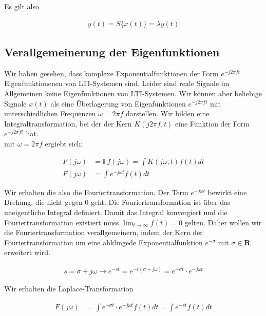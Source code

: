 \documentclass[10pt,a4paper]{article}
\begin{document}
  Es gilt also 
  \begin{mdframed}[style=exercise]
    \begin{align*}
        y(t) = S\{x(t)\} = \lambda y(t) 
    \end{align*}
  \end{mdframed}
  

  \subsection{Verallgemeinerung der Eigenfunktionen}
  Wir haben gesehen, dass komplexe Exponentialfunktionen der Form $e^{-j2\pi ft}$ Eigenfunktionenen von LTI-Systemen sind.
  Leider sind reale Signale im Allgemeinen keine Eigenfunktionen von LTI-Systemen.
  Wir können aber beliebige Signale $x(t)$ als eine Überlagerung von Eigenfunktionen $e^{-j2\pi ft}$ mit unterschiedlichen
  Frequenzen $\omega = 2\pi f$ darstellen.
  Wir bilden eine Integraltransformation, bei der der Kern $K(j2\pi f,t)$ eine Funktion der Form $e^{-j2\pi ft}$ hat.\\
  mit $\omega = 2\pi f$ ergiebt sich:
  \begin{mdframed}[style=exercise]
    \begin{align*}
        F(j\omega) &= \mathbb{F}f(j\omega) = \displaystyle\int K(j\omega,t) f(t) dt\\
        F(j\omega) &= \displaystyle\int  e^{-j\omega t} f(t) dt
    \end{align*}
  \end{mdframed}
  Wir erhalten die also die Fouriertransformation.
  Der Term $e^{-j \omega t}$ bewirkt eine Drehung, die nicht gegen 0 geht. Die Fouriertransformation ist über das uneigentliche Integral definiert.
  Damit das Integral konvergiert und die Fouriertransformation existiert muss $\lim_{t\rightarrow\infty} f(t)=0$ gelten.
  Daher wollen wir die Fouriertransformation verallgemeinern, indem der Kern der Fouriertransformation um 
  eine abklingede Exponentialfunktion $e^{-\sigma} $ mit $ \sigma \in \mathbf{R}$ erweitert wird.
  \begin{mdframed}[style=exercise]
    \begin{align*}
        s = \sigma + j \omega \rightarrow e^{-st} = e^{-t(\sigma + j \omega) } = e^{-\sigma t} \cdot e^{-j \omega t}
    \end{align*}
  \end{mdframed}
  Wir erhalten die Laplace-Transformation
  \begin{mdframed}[style=exercise]
    \begin{align*}
        F(j\omega) &= \displaystyle\int  e^{-\sigma t} \cdot e^{-j\omega t} f(t) dt = \displaystyle\int  e^{-st} f(t) dt
    \end{align*}
  \end{mdframed}
\end{document}

